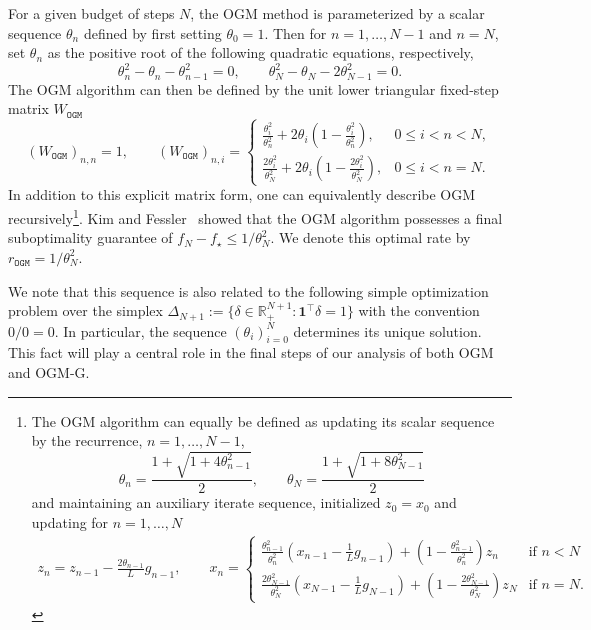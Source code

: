 \documentclass[11pt]{article}
\begin{document}
For a given budget of steps $N$, the OGM method is parameterized by a scalar sequence $\theta_n$ defined by first setting $\theta_0=1$. Then for $n=1,\dots,N-1$ and $n=N$, set $\theta_n$ as the positive root of the following quadratic equations, respectively,
\begin{equation}\label{eq:ogm-rate-recursion}
\theta_n^2-\theta_n-\theta_{n-1}^2=0,\qquad 
\theta_N^2-\theta_N-2\theta_{N-1}^2=0.
\end{equation}
The OGM algorithm can then be defined by the unit lower triangular fixed-step matrix $W_\mathtt{OGM}$
\begin{equation}\label{eq:ogm-W}
(W_\mathtt{OGM})_{n,n}=1,
\qquad
(W_\mathtt{OGM})_{n,i}=
\begin{cases}
\frac{\theta_i^2}{\theta_n^2}
+2\theta_i
\left(1-\frac{\theta_i^2}{\theta_n^2}\right),
&0\leq i<n<N,\\
\frac{2\theta_i^2}{\theta_N^2}
+2\theta_i
\left(1-\frac{2\theta_i^2}{\theta_N^2}\right),
&0\leq i<n=N.
\end{cases}
\end{equation}
In addition to this explicit matrix form, one can equivalently describe OGM recursively\footnote{The OGM algorithm can equally be defined as updating its scalar sequence by the recurrence, $n=1,\dots,N-1$,
\[
\theta_n=\frac{1+\sqrt{1+4\theta_{n-1}^2}}{2},
\qquad
\theta_N=\frac{1+\sqrt{1+8\theta_{N-1}^2}}{2}
\]
and maintaining an auxiliary iterate sequence, initialized $z_0=x_0$ and updating for $n=1,\dots,N$
\begin{equation*}
\begin{aligned}
z_{n}=z_{n-1}-\frac{2\theta_{n-1}}{L}g_{n-1}, \qquad
x_{n}
=\begin{cases}
\frac{\theta_{n-1}^2}{\theta_n^2}\left(x_{n-1} - \frac{1}{L}g_{n-1}\right)
+\left(1-\frac{\theta_{n-1}^2}{\theta_n^2}\right)z_{n}
&\text{if }n<N\\
\frac{2\theta_{N-1}^2}{\theta_N^2}\left(x_{N-1} - \frac{1}{L}g_{N-1}\right)
+\left(1-\frac{2\theta_{N-1}^2}{\theta_N^2}\right)z_N
& \text{if }n=N.
\end{cases}
\end{aligned}
\end{equation*}
}.
Kim and Fessler~\cite{KF16} showed that the OGM algorithm possesses a final suboptimality guarantee of $f_N-f_\star\leq 1/\theta_N^2$. We denote this optimal rate by $r_\mathtt{OGM}=1/\theta_N^2$.


We note that this sequence is also related to the following simple optimization problem over the simplex $\Delta_{N+1} :=\{\delta\in\mathbb{R}^{N+1}_+:\mathbf 1^\top\delta=1\}$ with the
convention $0/0=0$. In particular, the sequence $(\theta_i)_{i=0}^N$ determines its unique solution. This fact will play a central role in the final steps of our analysis of both OGM and OGM-G.
\end{document}
